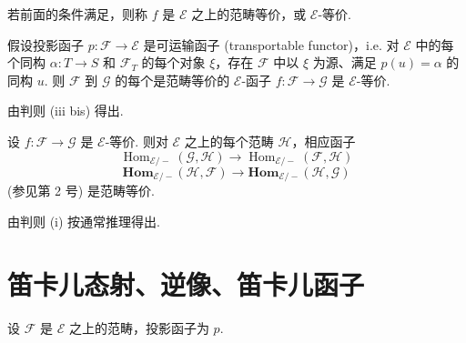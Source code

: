 \begin{definition}\label{def:VI.4.3}
若前面的条件满足，则称 $f$ 是 $\mathcal{E}$ 之上的范畴等价，或 $\mathcal{E}$-等价.
\end{definition}

\begin{corollary}\label{cor:VI.4.4}
假设投影函子 $p \colon \mathcal{F} \to \mathcal{E}$ 是可运输函子 (transportable functor)，i.e. 对 $\mathcal{E}$ 中的每个同构 $\alpha \colon T \to S$ 和 $\mathcal{F}_T$ 的每个对象 $\xi$，存在 $\mathcal{F}$ 中以 $\xi$ 为源、满足 $p(u) = \alpha$ 的同构 $u$. 则 $\mathcal{F}$ 到 $\mathcal{G}$ 的每个是范畴等价的 $\mathcal{E}$-函子 $f \colon \mathcal{F} \to \mathcal{G}$ 是 $\mathcal{E}$-等价.
\end{corollary}

由判则 (iii bis) 得出.

\begin{corollary}\label{cor:VI.4.5}
设 $f \colon \mathcal{F} \to \mathcal{G}$ 是 $\mathcal{E}$-等价. 则对 $\mathcal{E}$ 之上的每个范畴 $\mathcal{H}$，相应函子
\[
\operatorname{Hom}_{\mathcal{E}/-}(\mathcal{G}, \mathcal{H}) \longrightarrow \operatorname{Hom}_{\mathcal{E}/-}(\mathcal{F}, \mathcal{H})
\]
\[
\mathbf{Hom}_{\mathcal{E}/-}(\mathcal{H}, \mathcal{F}) \longrightarrow \mathbf{Hom}_{\mathcal{E}/-}(\mathcal{H}, \mathcal{G})
\]
(参见第 2 号) 是范畴等价.
\end{corollary}

由判则 (i) 按通常推理得出.

\section{笛卡儿态射、逆像、笛卡儿函子}

设 $\mathcal{F}$ 是 $\mathcal{E}$ 之上的范畴，投影函子为 $p$.


